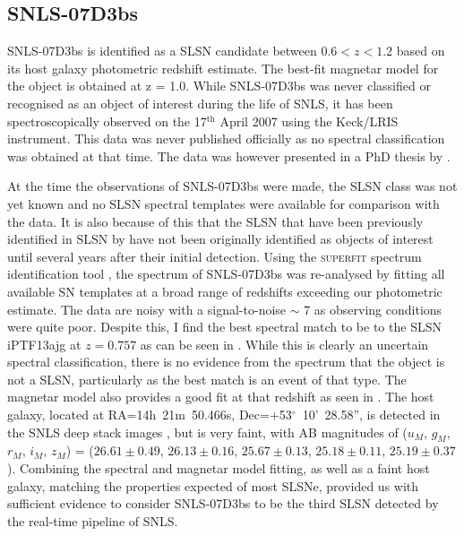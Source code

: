 \subsection{SNLS-07D3bs}
\label{sec:07D3bs}
SNLS-07D3bs is identified as a SLSN candidate between $0.6<z<1.2$ based on its host galaxy photometric redshift estimate. The best-fit magnetar model for the object is obtained at z = 1.0. While SNLS-07D3bs was never classified or recognised as an object of interest during the life of SNLS, it has been spectroscopically observed on the 17$^{\mathrm{th}}$ April 2007 using the Keck/LRIS instrument. This data was never published officially as no spectral classification was obtained at that time. The data was however presented in a PhD thesis by \citet{Fakhouri2013}.

At the time the observations of SNLS-07D3bs were made, the SLSN class was not yet known and no SLSN spectral templates were available for comparison with the data. It is also because of this that the SLSN that have been previously identified in SLSN by \citet{Howell2013} have not been originally identified as objects of interest until several years after their initial detection. Using the \textsc{superfit} spectrum identification tool \citep{Howell2005}, the spectrum of SNLS-07D3bs was re-analysed by fitting all available SN templates at a broad range of redshifts exceeding our photometric estimate. The data are noisy with a signal-to-noise $\sim$ 7 as observing conditions were quite poor. Despite this, I find the best spectral match to be to the SLSN iPTF13ajg at $z=0.757$ as can be seen in . While this is clearly an uncertain spectral classification, there is no evidence from the spectrum that the object is not a SLSN, particularly as the best match is an event of that type. The magnetar model also provides a good fit at that redshift as seen in  . The host galaxy, located at RA=14h~21m~50.466s, Dec=+53$^{\circ}$~10'~28.58'', is detected in the SNLS deep stack images \citep{Ilbert2006}, but is very faint, with AB magnitudes of ($u_M$, $g_M$, $r_M$, $i_M$, $z_M$) = ($26.61\pm0.49$, $26.13\pm0.16$, $25.67\pm0.13$, $25.18\pm0.11$, $25.19\pm0.37$). Combining the spectral and magnetar model fitting, as well as a faint host galaxy, matching the properties expected of most SLSNe, provided us with sufficient evidence to consider SNLS-07D3bs to be the third SLSN detected by the real-time pipeline of SNLS.

